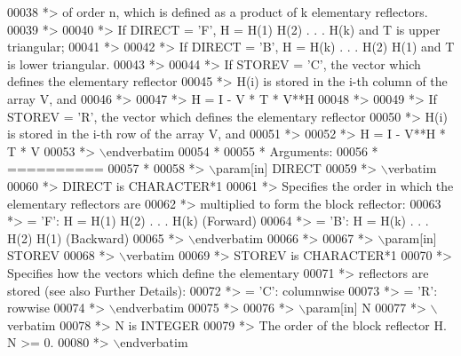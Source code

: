 \begin{DoxyCode}
00038 \textcolor{comment}{*> of order n, which is defined as a product of k elementary reflectors.}
00039 \textcolor{comment}{*>}
00040 \textcolor{comment}{*> If DIRECT = 'F', H = H(1) H(2) . . . H(k) and T is upper triangular;}
00041 \textcolor{comment}{*>}
00042 \textcolor{comment}{*> If DIRECT = 'B', H = H(k) . . . H(2) H(1) and T is lower triangular.}
00043 \textcolor{comment}{*>}
00044 \textcolor{comment}{*> If STOREV = 'C', the vector which defines the elementary reflector}
00045 \textcolor{comment}{*> H(i) is stored in the i-th column of the array V, and}
00046 \textcolor{comment}{*>}
00047 \textcolor{comment}{*>    H  =  I - V * T * V**H}
00048 \textcolor{comment}{*>}
00049 \textcolor{comment}{*> If STOREV = 'R', the vector which defines the elementary reflector}
00050 \textcolor{comment}{*> H(i) is stored in the i-th row of the array V, and}
00051 \textcolor{comment}{*>}
00052 \textcolor{comment}{*>    H  =  I - V**H * T * V}
00053 \textcolor{comment}{*> \(\backslash\)endverbatim}
00054 \textcolor{comment}{*}
00055 \textcolor{comment}{*  Arguments:}
00056 \textcolor{comment}{*  ==========}
00057 \textcolor{comment}{*}
00058 \textcolor{comment}{*> \(\backslash\)param[in] DIRECT}
00059 \textcolor{comment}{*> \(\backslash\)verbatim}
00060 \textcolor{comment}{*>          DIRECT is CHARACTER*1}
00061 \textcolor{comment}{*>          Specifies the order in which the elementary reflectors are}
00062 \textcolor{comment}{*>          multiplied to form the block reflector:}
00063 \textcolor{comment}{*>          = 'F': H = H(1) H(2) . . . H(k) (Forward)}
00064 \textcolor{comment}{*>          = 'B': H = H(k) . . . H(2) H(1) (Backward)}
00065 \textcolor{comment}{*> \(\backslash\)endverbatim}
00066 \textcolor{comment}{*>}
00067 \textcolor{comment}{*> \(\backslash\)param[in] STOREV}
00068 \textcolor{comment}{*> \(\backslash\)verbatim}
00069 \textcolor{comment}{*>          STOREV is CHARACTER*1}
00070 \textcolor{comment}{*>          Specifies how the vectors which define the elementary}
00071 \textcolor{comment}{*>          reflectors are stored (see also Further Details):}
00072 \textcolor{comment}{*>          = 'C': columnwise}
00073 \textcolor{comment}{*>          = 'R': rowwise}
00074 \textcolor{comment}{*> \(\backslash\)endverbatim}
00075 \textcolor{comment}{*>}
00076 \textcolor{comment}{*> \(\backslash\)param[in] N}
00077 \textcolor{comment}{*> \(\backslash\)verbatim}
00078 \textcolor{comment}{*>          N is INTEGER}
00079 \textcolor{comment}{*>          The order of the block reflector H. N >= 0.}
00080 \textcolor{comment}{*> \(\backslash\)endverbatim}

\end{DoxyCode}
